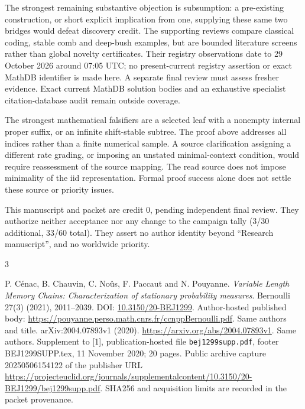 \documentclass[11pt]{article}
\begin{document}
The strongest remaining substantive objection is subsumption: a pre-existing
construction, or short explicit implication from one, supplying these same
two bridges would defeat discovery credit. The supporting reviews compare
classical coding, stable comb and deep-bush examples, but are bounded
literature screens rather than global novelty certificates. Their registry
observations date to 29 October 2026 around 07:05 UTC; no present-current
registry assertion or exact MathDB identifier is made here. A separate final
review must assess fresher evidence. Exact current MathDB solution bodies
and an exhaustive specialist citation-database audit remain outside coverage.

The strongest mathematical falsifiers are a selected leaf with a nonempty
internal proper suffix, or an infinite shift-stable subtree. The proof above
addresses all indices rather than a finite numerical sample. A source
clarification assigning a different rate grading, or imposing an unstated
minimal-context condition, would require reassessment of the source mapping.
The read source does not impose minimality of the iid representation.
Formal proof success alone does not settle these source or priority issues.

This manuscript and packet are credit 0, pending independent final review.
They authorize neither acceptance nor any change to the campaign tally
(3/30 additional, 33/60 total). They assert no author identity beyond
``Research manuscript'', and no worldwide priority.

\begin{thebibliography}{3}
\raggedright
{} P. C\'enac, B. Chauvin, C. No\^us, F. Paccaut and
N. Pouyanne. \emph{Variable Length Memory Chains: Characterization of stationary
probability measures}. Bernoulli 27(3) (2021), 2011--2039.
DOI: \href{https://doi.org/10.3150/20-BEJ1299}{10.3150/20-BEJ1299}.
Author-hosted published body:
\url{https://pouyanne.perso.math.cnrs.fr/ccnppBernoulli.pdf}.
 Same authors and title. arXiv:2004.07893v1 (2020).
\url{https://arxiv.org/abs/2004.07893v1}.
 Same authors. Supplement to [1], publication-hosted file
\texttt{bej1299supp.pdf}, footer BEJ1299SUPP.tex, 11 November 2020;
20 pages. Public archive capture 20250506154122 of the publisher URL
\url{https://projecteuclid.org/journals/supplementalcontent/10.3150/20-BEJ1299/bej1299supp.pdf}.
SHA256 and acquisition limits are recorded in the packet provenance.
\end{thebibliography}
\end{document}
